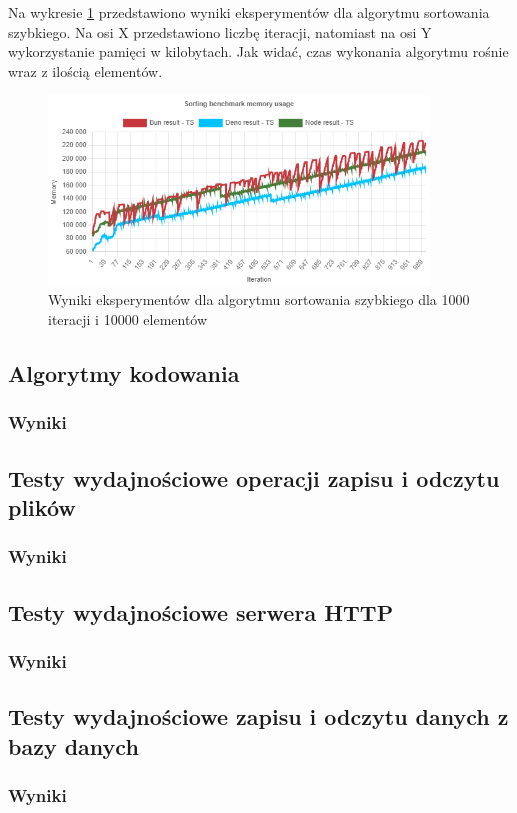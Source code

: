 Na wykresie \ref{fig:radix_sorting_e6_memory_ts} przedstawiono wyniki eksperymentów dla algorytmu sortowania szybkiego. Na osi X przedstawiono liczbę iteracji, natomiast na osi Y wykorzystanie pamięci w kilobytach. Jak widać, czas wykonania algorytmu rośnie wraz z ilością elementów.
\begin{figure}[H]
  \centering
  \includegraphics[width=0.9\textwidth]{Figures/sorting/radix/e6_memory_ts.png}
  \caption{Wyniki eksperymentów dla algorytmu sortowania szybkiego dla 1000 iteracji i 10000 elementów}
  \label{fig:radix_sorting_e6_memory_ts}
\end{figure}
\subsection{Algorytmy kodowania}

\subsubsection{Wyniki}

\subsection{Testy wydajnościowe operacji zapisu i odczytu plików}

\subsubsection{Wyniki}

\subsection{Testy wydajnościowe serwera HTTP}

\subsubsection{Wyniki}

\subsection{Testy wydajnościowe zapisu i odczytu danych z bazy danych}

\subsubsection{Wyniki}